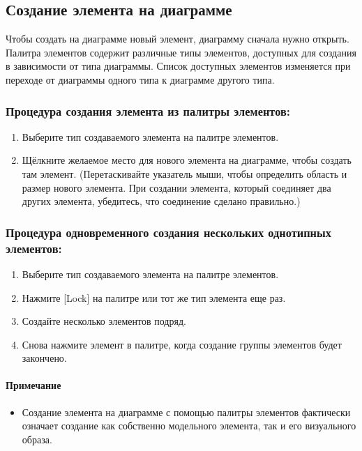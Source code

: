 \documentclass[a4paper,12pt]{extreport}
\begin{document}
\subsection*{Создание элемента на диаграмме}
Чтобы создать на диаграмме новый элемент, диаграмму сначала нужно открыть. Палитра
элементов содержит различные типы элементов, доступных для создания в зависимости от типа
диаграммы. Список доступных элементов изменяется при переходе от диаграммы одного типа к
диаграмме другого типа.


\subsubsection*{Процедура создания элемента из палитры элементов:}
\begin{enumerate}
	\item Выберите тип создаваемого элемента на палитре элементов.
	\item Щёлкните желаемое место для нового элемента на диаграмме, чтобы создать там элемент.
	(Перетаскивайте указатель мыши, чтобы определить область и размер нового элемента. При
	создании элемента, который соединяет два других элемента, убедитесь, что соединение
	сделано правильно.)
\end{enumerate}

\subsubsection*{Процедура одновременного создания нескольких однотипных элементов:}
\begin{enumerate}
	\item Выберите тип создаваемого элемента на палитре элементов.
	\item Нажмите [Lock] на палитре или тот же тип элемента еще раз.
	\item Создайте несколько элементов подряд.
	\item Снова нажмите элемент в палитре, когда создание группы элементов будет закончено.
\end{enumerate}

\paragraph{Примечание}
\begin{itemize}
	\item Создание элемента на диаграмме с помощью палитры элементов фактически означает
	создание как собственно модельного элемента, так и его визуального образа.
\end{itemize}
\end{document}

